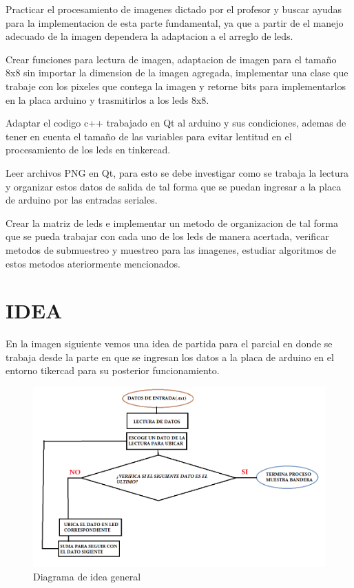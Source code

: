 \documentclass{article}
\begin{document}
Practicar el procesamiento de imagenes dictado por el profesor y buscar ayudas para la implementacion de esta parte fundamental, ya que a partir de el manejo adecuado de la imagen dependera la adaptacion a el arreglo de leds.

Crear funciones para lectura de imagen, adaptacion de imagen para el tamaño 8x8 sin importar la dimension de la imagen agregada, implementar una clase que trabaje con los pixeles que contega la imagen y retorne bits para implementarlos en la placa arduino y trasmitirlos a los leds 8x8.

Adaptar el codigo c++ trabajado en Qt al arduino y sus condiciones, ademas de tener en cuenta el tamaño de las variables para evitar lentitud en el procesamiento de los leds en tinkercad.

Leer archivos PNG en Qt, para esto se debe investigar como se trabaja la lectura y organizar estos datos de salida de tal forma que se puedan ingresar a la placa de arduino por las entradas seriales.

Crear la matriz de leds e implementar un metodo de organizacion de tal forma que se pueda trabajar con cada uno  de los leds de manera acertada, verificar metodos de submuestreo y muestreo para las imagenes, estudiar algoritmos de estos metodos ateriormente mencionados.

\section{IDEA}
En la imagen siguiente vemos una idea de partida para el parcial en donde se trabaja desde la parte en que se ingresan los datos a la placa de arduino en el entorno tikercad para su posterior funcionamiento.\\
    \begin{figure}[h]
    \includegraphics[width=14cm]{diagrama.png}
    \centering
    \caption{Diagrama de idea general}
    \label{fig:diagrama}
    \end{figure}
\end{document}
